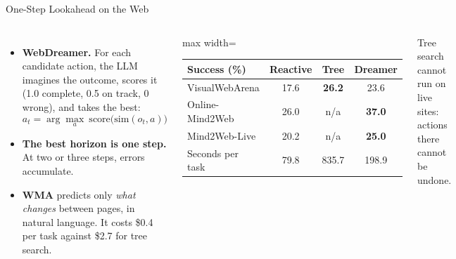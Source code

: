 \begin{frame}{One-Step Lookahead on the Web}
    \begin{columns}[T,onlytextwidth]
        \begin{itemize}\itemsep0.45em
            \item \textbf{WebDreamer.} For each candidate action, the LLM imagines the outcome, scores it (1.0 complete, 0.5 on track, 0 wrong), and takes the best:
            \[
                a_t = \arg\max_{a}\ \mathrm{score}\big(\mathrm{sim}(o_t,a)\big)
            \]
            \item \textbf{The best horizon is one step.} At two or three steps, errors accumulate.
            \item \textbf{WMA} predicts only \emph{what changes} between pages, in natural language. It costs \$0.4 per task against \$2.7 for tree search.
        \end{itemize}
        \centering
        \small
        \renewcommand{\arraystretch}{1.15}
        \begin{adjustbox}{max width=\linewidth}\begin{tabular}{>{\raggedright\arraybackslash}p{2.5cm}ccc}
            \toprule
            \textbf{Success (\%)} & \textbf{Reactive} & \textbf{Tree} & \textbf{Dreamer} \\
            \midrule
            VisualWebArena & 17.6 & \textbf{26.2} & 23.6 \\
            Online-Mind2Web & 26.0 & n/a & \textbf{37.0} \\
            Mind2Web-Live & 20.2 & n/a & \textbf{25.0} \\
            \midrule
            Seconds per task & 79.8 & 835.7 & 198.9 \\
            \bottomrule
        \end{tabular}\end{adjustbox}

        \vspace{0.4em}
        {\footnotesize Tree search cannot run on live sites: actions there cannot be undone.}
    \end{columns}
    \vspace{0.3em}
\end{frame}


